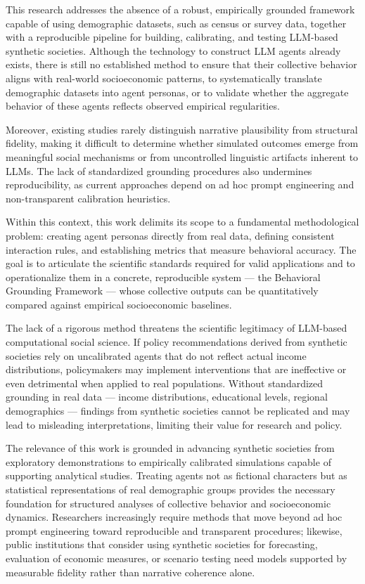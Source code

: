 
This research addresses the absence of a robust, empirically grounded framework capable of using demographic datasets, such as census or survey data, together with a reproducible pipeline for building, calibrating, and testing LLM-based synthetic societies. Although the technology to construct LLM agents already exists, there is still no established method to ensure that their collective behavior aligns with real-world socioeconomic patterns, to systematically translate demographic datasets into agent personas, or to validate whether the aggregate behavior of these agents reflects observed empirical regularities.

Moreover, existing studies rarely distinguish narrative plausibility from structural fidelity, making it difficult to determine whether simulated outcomes emerge from meaningful social mechanisms or from uncontrolled linguistic artifacts inherent to LLMs. The lack of standardized grounding procedures also undermines reproducibility, as current approaches depend on ad hoc prompt engineering and non-transparent calibration heuristics.

Within this context, this work delimits its scope to a fundamental methodological problem: creating agent personas directly from real data, defining consistent interaction rules, and establishing metrics that measure behavioral accuracy. The goal is to articulate the scientific standards required for valid applications and to operationalize them in a concrete, reproducible system — the Behavioral Grounding Framework — whose collective outputs can be quantitatively compared against empirical socioeconomic baselines.


The lack of a rigorous method threatens the scientific legitimacy of LLM-based computational social science. If policy recommendations derived from synthetic societies rely on uncalibrated agents that do not reflect actual income distributions, policymakers may implement interventions that are ineffective or even detrimental when applied to real populations. Without standardized grounding in real data — income distributions, educational levels, regional demographics — findings from synthetic societies cannot be replicated and may lead to misleading interpretations, limiting their value for research and policy.

The relevance of this work is grounded in advancing synthetic societies from exploratory demonstrations to empirically calibrated simulations capable of supporting analytical studies. Treating agents not as fictional characters but as statistical representations of real demographic groups provides the necessary foundation for structured analyses of collective behavior and socioeconomic dynamics. Researchers increasingly require methods that move beyond ad hoc prompt engineering toward reproducible and transparent procedures; likewise, public institutions that consider using synthetic societies for forecasting, evaluation of economic measures, or scenario testing need models supported by measurable fidelity rather than narrative coherence alone.

